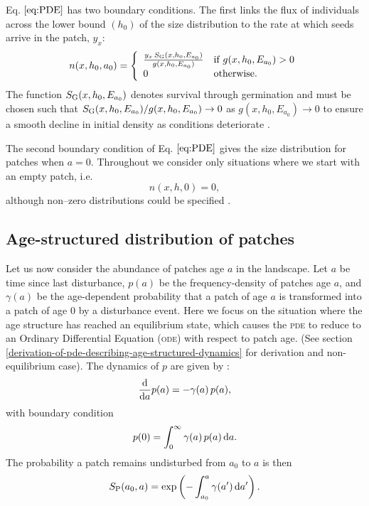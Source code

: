 \documentclass[10pt,twoside]{article}
\begin{document}
Eq. \(\ref{eq:PDE}\) has two boundary conditions. The first links the
flux of individuals across the lower bound \((h_0)\) of the size
distribution to the rate at which seeds arrive in the patch, \(y_x\):
\begin{equation} \label{eq:BC1}
  n(x,h_0,a_0)  = \left\{
  \begin{array}{ll}   \frac{y_x  \, S_{\rm G} (x, h_0, E_{a_0}) }{ g(x,h_0, E_{a_0}) }  & \textrm{if } g(x,h_0, E_{a_0}) > 0 \\
  0 & \textrm{otherwise.}
  \end{array} \right.
\end{equation}
The function \(S_{\rm G} (x, h_0, E_{a_0})\) denotes survival through
germination and must be chosen such that
\(S_{\rm G} (x, h_0, E_{a_0}) / g(x,h_0, E_{a_0}) \rightarrow 0\) as
\(g(x,h_0, E_{a_0}) \rightarrow 0\) to ensure a smooth decline in
initial density as conditions deteriorate \citep{Falster-2011}.

The second boundary condition of Eq. \(\ref{eq:PDE}\) gives the size
distribution for patches when \(a=0\). Throughout we consider only
situations where we start with an empty patch, i.e.
\begin{equation} \label{eq:BC2} n\left(x,h,0\right) =0,
\end{equation}
although non--zero distributions could be specified
\citep[e.g][]{Moorcroft-2001}.

\subsection{Age-structured distribution of
patches}\label{age-structured-distribution-of-patches}

Let us now consider the abundance of patches age \(a\) in the landscape.
Let \(a\) be time since last disturbance, \(p(a)\) be the
frequency-density of patches age \(a\), and \(\gamma(a)\) be the
age-dependent probability that a patch of age \(a\) is transformed into
a patch of age 0 by a disturbance event. Here we focus on the situation
where the age structure has reached an equilibrium state, which causes
the \textsc{pde} to reduce to an Ordinary Differential Equation (\textsc{ode}) with
respect to patch age. (See section
\ref{derivation-of-pde-describing-age-structured-dynamics} for derivation and
non-equilibrium case). The dynamics of \(p\) are given by
\citep{Vonfoerster-1959, Mckendrick-1926}:
\begin{equation} \label{eq:agepde}
\frac{{\rm d}}{{\rm d} a} p(a)  = -\gamma(a) \, p(a) ,
\end{equation}
with boundary condition
\begin{equation}  p(0)  = \int_0^\infty \gamma(a) \, p(a) \, {\rm d} a.
\end{equation}
The probability a patch remains undisturbed from \(a_0\) to \(a\) is
then
\begin{equation} \label{eq:survivalPatch}
  S_{\rm P} (a_0,a) = \exp\left(-\int_{a_0}^{a} \gamma(a^\prime) \, {\rm d} a^\prime \right).
\end{equation}
\end{document}
